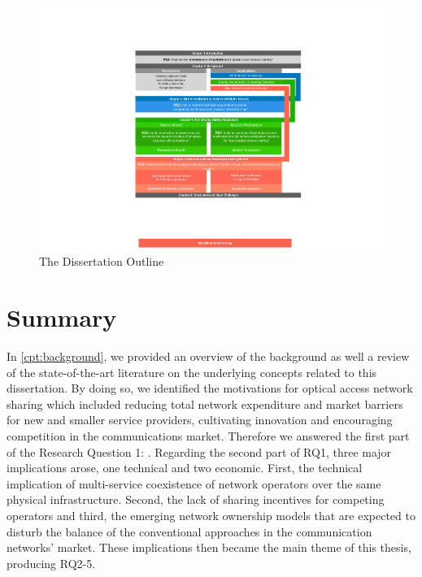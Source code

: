 \begin{figure}[tbhp]
\centering
\includegraphics[width=\linewidth]{Figures/outline.pdf}
\caption{The Dissertation Outline}
\label{fig:outline}
\end{figure}
\section{Summary}
In \autoref{cpt:background}, we provided an overview of the background as well a review of the state-of-the-art literature on the underlying concepts related to this dissertation. By doing so, we identified the motivations for optical access network sharing which included reducing total network expenditure and market barriers for new and smaller service providers, cultivating innovation and encouraging competition in the communications market. Therefore we answered the first part of the Research Question 1: \textit{\RQa}. Regarding the second part of RQ1, three major implications arose, one technical and two economic. First, the technical implication of multi-service coexistence of network operators over the same physical infrastructure. Second, the lack of sharing incentives for competing operators and third, the emerging network ownership models that are expected to disturb the balance of the conventional approaches in the communication networks' market. These implications then became the main theme of this thesis, producing RQ2-5.



